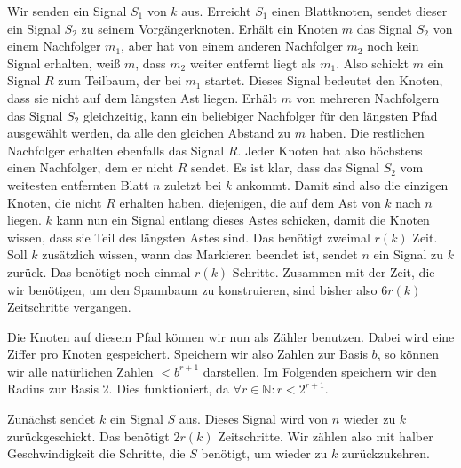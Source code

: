 \documentclass[11pt]{article}
\begin{document}
Wir senden ein Signal $S_1$ von $k$ aus. Erreicht $S_1$ einen Blattknoten, sendet dieser ein Signal $S_2$ zu seinem Vorgängerknoten. 
Erhält ein Knoten $m$ das Signal $S_2$ von einem Nachfolger $m_1$, aber hat von einem anderen Nachfolger $m_2$ noch kein Signal erhalten, weiß $m$, dass $m_2$ weiter entfernt liegt als $m_1$. 
Also schickt $m$ ein Signal $R$ zum Teilbaum, der bei $m_1$ startet. Dieses Signal bedeutet den Knoten, dass sie nicht auf dem längsten Ast liegen. 
Erhält $m$  von mehreren Nachfolgern das Signal $S_2$ gleichzeitig, kann ein beliebiger Nachfolger für den längsten Pfad ausgewählt werden, da alle den gleichen Abstand zu $m$ haben. 
Die restlichen Nachfolger erhalten ebenfalls das Signal $R$. 
Jeder Knoten hat also höchstens einen Nachfolger, dem er nicht $R$ sendet. 
Es ist klar, dass das Signal $S_2$ vom weitesten entfernten Blatt $n$ zuletzt bei $k$ ankommt. 
Damit sind also die einzigen Knoten, die nicht $R$ erhalten haben, diejenigen, die auf dem Ast von $k$ nach $n$ liegen.
$k$ kann nun ein Signal entlang dieses Astes schicken, damit die Knoten wissen, dass sie Teil des längsten Astes sind.
Das benötigt zweimal $r(k)$ Zeit. Soll $k$ zusätzlich wissen, wann das Markieren beendet ist, sendet $n$ ein Signal zu $k$ zurück. Das benötigt noch einmal $r(k)$ Schritte.
Zusammen mit der Zeit, die wir benötigen, um den Spannbaum zu konstruieren, sind bisher also $6r(k)$ Zeitschritte vergangen.

Die Knoten auf diesem Pfad können wir nun als Zähler benutzen.
Dabei wird eine Ziffer pro Knoten gespeichert. Speichern wir also Zahlen zur Basis $b$, so können wir alle natürlichen Zahlen $< b^{r+1}$ darstellen. Im Folgenden speichern wir den Radius zur Basis 2. Dies funktioniert, da $\forall r \in \mathbb{N} : r < 2^{r+1}$.

Zunächst sendet $k$ ein Signal $S$ aus. Dieses Signal wird von $n$ wieder zu $k$ zurückgeschickt. Das benötigt $2r(k)$ Zeitschritte. Wir zählen also mit halber Geschwindigkeit die Schritte, die $S$ benötigt, um wieder zu $k$ zurückzukehren.
\end{document}
